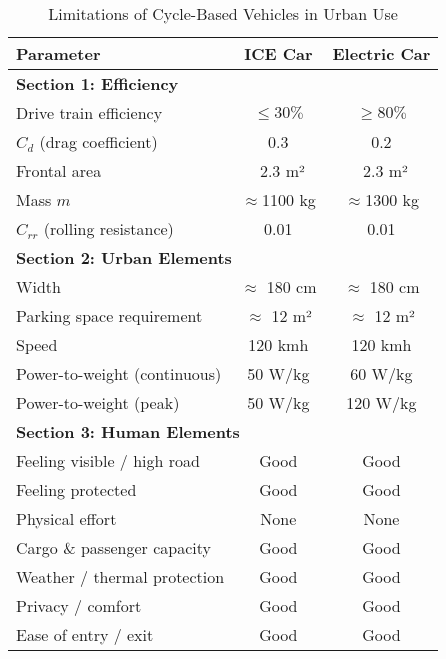 \begin{table}[h!]
\centering\caption{Limitations of Cycle-Based Vehicles in Urban Use}
\begin{tabular}{lcc}
\toprule
\textbf{Parameter} & \textbf{ICE Car} & \textbf{Electric Car} \\
\midrule
\multicolumn{3}{l}{\textbf{Section 1: Efficiency}} \\
Drive train efficiency    & \cellcolor{LightRed}$\leq30\%$ & \cellcolor{LightGreen}$\geq80\%$ \\
$C_d$ (drag coefficient)     & \cellcolor{LightRed} 0.3         & \cellcolor{LightOrange}0.2 \\
Frontal area                 & \cellcolor{LightRed}~2.3 m²   & \cellcolor{LightRed}~2.3 m² \\
Mass $m$         & \cellcolor{LightRed} $\approx$1100 kg & \cellcolor{LightRed} $\approx$1300 kg \\
$C_{rr}$ (rolling resistance)& \cellcolor{LightOrange}0.01    & \cellcolor{LightOrange}0.01  \\
\midrule
\multicolumn{3}{l}{\textbf{Section 2: Urban Elements}} \\
Width            & \cellcolor{LightRed} $\approx$ 180 cm & \cellcolor{LightRed}$\approx$ 180 cm \\
Parking space requirement    & \cellcolor{LightRed}$\approx$ 12 m²& \cellcolor{LightRed}$\approx$ 12 m²\\
Speed                        & \cellcolor{LightGreen}120 kmh     & \cellcolor{LightGreen}120 kmh \\
Power-to-weight (continuous) & \cellcolor{LightGreen}50 W/kg        & \cellcolor{LightGreen}60 W/kg\\
Power-to-weight (peak)       & \cellcolor{LightGreen}50 W/kg  & \cellcolor{LightGreen}120 W/kg\\
\midrule
\multicolumn{3}{l}{\textbf{Section 3: Human Elements}} \\
Feeling visible / high road  & \cellcolor{LightGreen}Good     & \cellcolor{LightGreen}Good \\
Feeling protected            & \cellcolor{LightGreen}Good       & \cellcolor{LightGreen}Good \\
Physical effort              & \cellcolor{LightGreen}None  & \cellcolor{LightGreen}None \\
Cargo \& passenger capacity  & \cellcolor{LightGreen}Good        & \cellcolor{LightGreen}Good \\
Weather / thermal protection & \cellcolor{LightGreen}Good    & \cellcolor{LightGreen}Good \\
Privacy / comfort            & \cellcolor{LightGreen}Good       & \cellcolor{LightGreen}Good \\
Ease of entry / exit         & \cellcolor{LightGreen}Good     & \cellcolor{LightGreen}Good \\
\bottomrule
\end{tabular}
\end{table}

